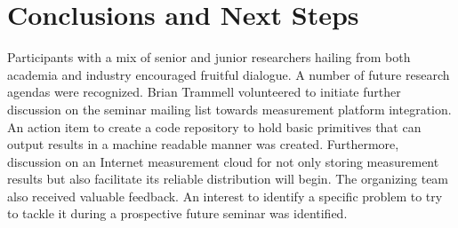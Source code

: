 \section{Conclusions and Next Steps}\label{sec:conclusion}

Participants with a mix of senior and junior researchers hailing from both
academia and industry encouraged fruitful dialogue. A number of future
research agendas were recognized. Brian Trammell volunteered to initiate
further discussion on the seminar mailing list towards measurement platform
integration. An action item to create a code repository to hold basic
primitives that can output results in a machine readable manner was created.
Furthermore, discussion on an Internet measurement cloud for not only storing
measurement results but also facilitate its reliable distribution will begin.
The organizing team also received valuable feedback. An interest to identify a
specific problem to try to tackle it during a prospective future seminar was
identified.
